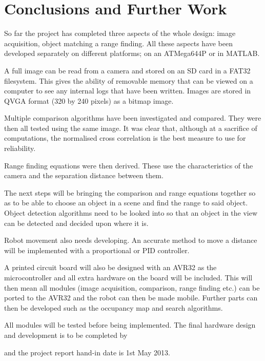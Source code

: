\chapter{Conclusions and Further Work} \label{Chapter: Conclusions}

So far the project has completed three aspects of the whole design: image acquisition, object matching a range finding. All these aspects have been developed separately on different platforms; on an ATMega644P or in MATLAB. 

A full image can be read from a camera and stored on an SD card in a FAT32 filesystem. This gives the ability of removable memory that can be viewed on a computer to see any internal logs that have been written. Images are stored in QVGA format (320 by 240 pixels) as a bitmap image. 

Multiple comparison algorithms have been investigated and compared. They were then all tested using the same image. It was clear that, although at a sacrifice of computations, the normalised cross correlation is the best measure to use for reliability.

Range finding equations were then derived. These use the characteristics of the camera and the separation distance between them. 

The next steps will be bringing the comparison and range equations together so as to be able to choose an object in a scene and find the range to said object. Object detection algorithms need to be looked into so that an object in the view can be detected and decided upon where it is. 

Robot movement also needs developing. An accurate method to move a distance will be implemented with a proportional or PID controller. 

A printed circuit board will also be designed with an AVR32 as the microcontroller and all extra hardware on the board will be included. This will then mean all modules (image acquisition, comparison, range finding etc.) can be ported to the AVR32 and the robot can then be made mobile. Further parts can then be developed such as the occupancy map and search algorithms. 

All modules will be tested before being implemented. The final hardware design and development is to be completed by \date{15th March 2013} and the project report hand-in date is 1st May 2013. 